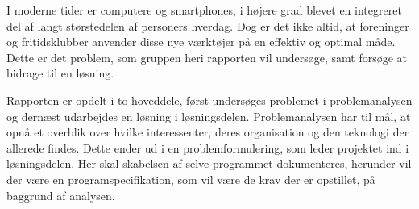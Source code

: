 I moderne tider er computere og smartphones, i højere grad blevet en integreret del af langt størstedelen af personers hverdag. 
Dog er det ikke altid, at foreninger og fritidsklubber anvender disse nye værktøjer på en effektiv og optimal måde. 
Dette er det problem, som gruppen heri rapporten vil undersøge, samt forsøge at bidrage til en løsning. 

Rapporten er opdelt i to hoveddele, først undersøges problemet i problemanalysen og dernæst udarbejdes en løsning i løsningsdelen. 
Problemanalysen har til mål, at opnå et overblik over hvilke interessenter, deres organisation og den teknologi der allerede findes. 
Dette ender ud i en problemformulering, som leder projektet ind i løsningsdelen. 
Her skal skabelsen af selve programmet dokumenteres, herunder vil der være en programspecifikation, som vil være de krav der er opstillet, på baggrund af analysen. 
